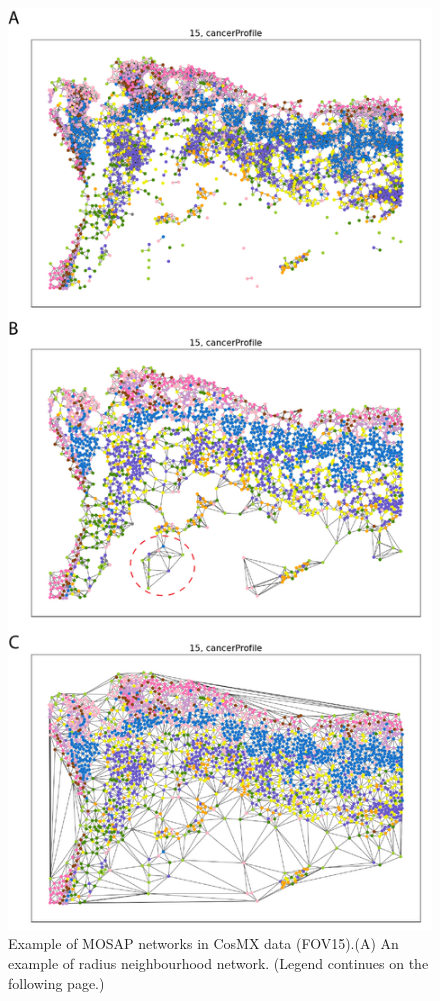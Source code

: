 \begin{figure}[htp]
    \centering
    \includegraphics[width=0.6\columnwidth]{Chapter4/Figures/Chap4_neighbourhood_networks_appendix.png}
    \caption[Examples MOSAP networks in CosMX data (FOV15)]{Example of MOSAP networks in CosMX data (FOV15).(A) An example of radius neighbourhood network. (Legend continues on the following page.)}
    \label{fig:Chap4_networks_models}
\end{figure}
\begin{figure}[t]
\end{figure}
